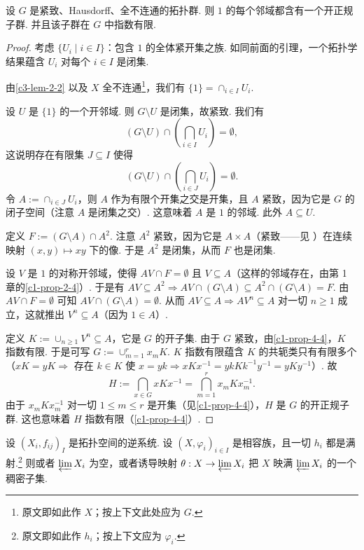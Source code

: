 \begin{lemma}\label{c3-lem-2-3}
设 $G$ 是紧致、Hausdorff、全不连通的拓扑群. 则 $1$ 的每个邻域都含有一个开正规子群. 并且该子群在 $G$ 中指数有限.
\end{lemma}

\begin{proof}
考虑 $\{U_i\mid i\in I\}$：包含 $1$ 的全体紧开集之族. 如同前面的引理，一个拓扑学结果蕴含 $U_i$ 对每个 $i\in I$ 是闭集.

由\autoref{c3-lem-2-2} 以及 $X$ 全不连通\footnote{原文即如此作 $X$；按上下文此处应为 $G$.}，我们有 $\{1\}=\cap_{i\in I}U_i$.

设 $U$ 是 $\{1\}$ 的一个开邻域. 则 $G\setminus U$ 是闭集，故紧致. 我们有
\[
(G\setminus U)\cap(\bigcap_{i\in I}U_i)=\emptyset,
\]
这说明存在有限集 $J\subseteq I$ 使得
\[
(G\setminus U)\cap(\bigcap_{i\in J}U_i)=\emptyset.
\]
令 $A:=\cap_{i\in J}U_i$，则 $A$ 作为有限个开集之交是开集，且 $A$ 紧致，因为它是 $G$ 的闭子空间（注意 $A$ 是闭集之交）. 这意味着 $A$ 是 $1$ 的邻域. 此外 $A\subseteq U$.

定义 $F:=(G\setminus A)\cap A^2$. 注意 $A^2$ 紧致，因为它是 $A\times A$（紧致——见 \cite[Theorem~26.7]{mun75}）在连续映射 $(x,y)\mapsto xy$ 下的像. 于是 $A^2$ 是闭集，从而 $F$ 也是闭集.

设 $V$ 是 $1$ 的对称开邻域，使得 $AV\cap F=\emptyset$ 且 $V\subseteq A$（这样的邻域存在，由第 1 章的\autoref{c1-prop-2-4}）. 于是有 $AV\subseteq A^2\Rightarrow AV\cap(G\setminus A)\subseteq A^2\cap(G\setminus A)=F$. 由 $AV\cap F=\emptyset$ 可知 $AV\cap(G\setminus A)=\emptyset$. 从而 $AV\subseteq A\Rightarrow AV^n\subseteq A$ 对一切 $n\geq 1$ 成立，这就推出 $V^n\subseteq A$（因为 $1\in A$）.

定义 $K:=\cup_{n\geq 1}V^n\subseteq A$，它是 $G$ 的开子集. 由于 $G$ 紧致，由\autoref{c1-prop-4-4}，$K$ 指数有限. 于是可写 $G:=\cup_{m=1}^r x_mK$. $K$ 指数有限蕴含 $K$ 的共轭类只有有限多个（$xK=yK\Rightarrow$ 存在 $k\in K$ 使 $x=yk\Rightarrow xKx^{-1}=ykKk^{-1}y^{-1}=yKy^{-1}$）. 故
\[
H:=\bigcap_{x\in G}xKx^{-1}=\bigcap_{m=1}^r x_mKx_m^{-1}.
\]
由于 $x_mKx_m^{-1}$ 对一切 $1\leq m\leq r$ 是开集（见\autoref{c1-prop-4-4}），$H$ 是 $G$ 的开正规子群. 这也意味着 $H$ 指数有限（\autoref{c1-prop-4-4}）.
\end{proof}

\begin{lemma}\label{c3-lem-2-4}
设 $(X_i,f_{ij})_I$ 是拓扑空间的逆系统. 设 $(X,\varphi_i)_{i\in I}$ 是相容族，且一切 $h_i$ 都是满射.\footnote{原文即如此作 $h_i$；按上下文应为 $\varphi_i$.} 则或者 $\varprojlim X_i$ 为空，或者诱导映射 $\theta:X\to\varprojlim X_i$ 把 $X$ 映满 $\varprojlim X_i$ 的一个稠密子集.
\end{lemma}

